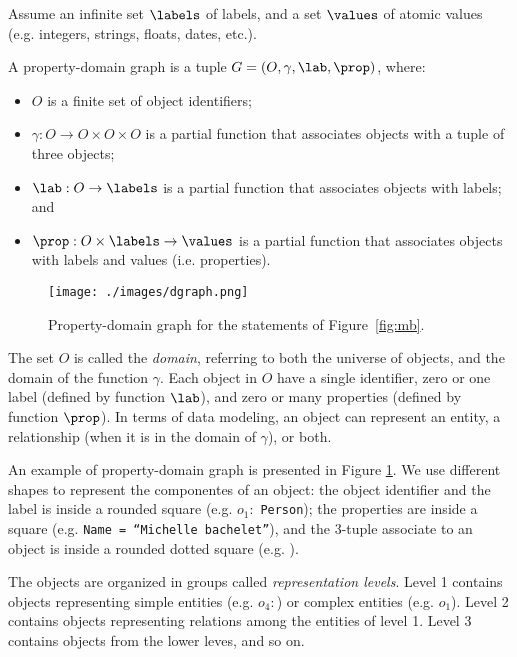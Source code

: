 Assume an infinite set $\labels$ of labels, and a set $\values$ of atomic values  (e.g. integers, strings, floats, dates, etc.). 
\begin{definition} 
 A property-domain graph is a tuple $G=(O,\gamma,\lab,\prop)$, where:
\begin{itemize}
\item $O$ is a finite set of object identifiers;
\item $\gamma : O \to O \times O \times O$ is a partial function that associates objects with a tuple of three objects; 
\item $\lab : O \to \labels$ is a partial function that associates objects with labels; and
\item $\prop : O \times \labels \to \values$ is a partial function that associates objects with labels and values (i.e. properties).
\end{itemize}
\end{definition}

 \begin{figure}[t]
\centering
\texttt{[image: ./images/dgraph.png]}
\caption{Property-domain graph for the statements of Figure~\ref{fig:mb}. \label{fig:dgraph}}
\end{figure}

The set $O$ is called the \textit{domain}, referring to both the universe of objects, and the domain of the function $\gamma$.
Each object in $O$ have a single identifier, zero or one label (defined by function $\lab$), and zero or many properties (defined by function $\prop$). In terms of data modeling, an object can represent an entity, a relationship (when it is in the domain of $\gamma$), or both.

An example of property-domain graph is presented in Figure \ref{fig:dgraph}.
We use different shapes to represent the componentes of an object: the object identifier and the label is inside a rounded square (e.g. $o_1:$ \texttt{Person}); the properties are inside a square (e.g. \texttt{Name = ``Michelle bachelet''}), and the 3-tuple associate to an object is inside a rounded dotted square (e.g. ).

The objects are organized in groups called \emph{representation levels}.
Level 1 contains objects representing simple entities (e.g. $o_4:$) or complex entities (e.g. $o_1$).
Level 2 contains objects representing relations among the entities of level 1.
Level 3 contains objects from the lower leves, and so on.
 
